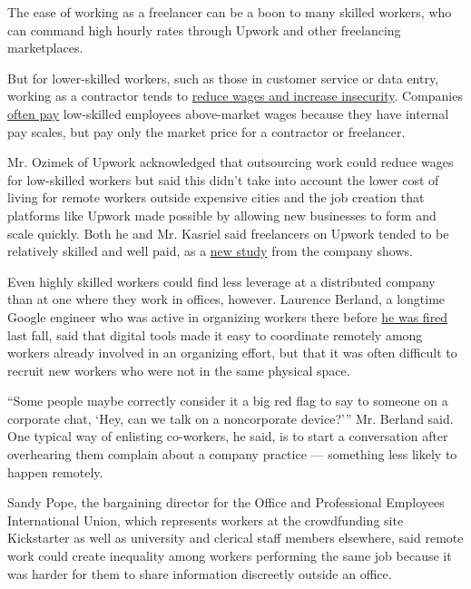 The ease of working as a freelancer can be a boon to many skilled
workers, who can command high hourly rates through Upwork and other
freelancing marketplaces.

But for lower-skilled workers, such as those in customer service or data
entry, working as a contractor tends to
\href{https://www.nytimes3xbfgragh.onion/2017/07/12/business/economy/flash-organizations-labor.html}{reduce
wages and increase insecurity}. Companies
\href{https://www.nytimes3xbfgragh.onion/interactive/2018/02/01/business/economy/wages-salaries-job-market.html}{often
pay} low-skilled employees above-market wages because they have internal
pay scales, but pay only the market price for a contractor or
freelancer.

Mr. Ozimek of Upwork acknowledged that outsourcing work could reduce
wages for low-skilled workers but said this didn't take into account the
lower cost of living for remote workers outside expensive cities and the
job creation that platforms like Upwork made possible by allowing new
businesses to form and scale quickly. Both he and Mr. Kasriel said
freelancers on Upwork tended to be relatively skilled and well paid, as
a
\href{https://www.upwork.com/press/economics/when-work-goes-remote/}{new
study} from the company shows.

Even highly skilled workers could find less leverage at a distributed
company than at one where they work in offices, however. Laurence
Berland, a longtime Google engineer who was active in organizing workers
there before
\href{https://www.nytimes3xbfgragh.onion/interactive/2020/02/18/magazine/google-revolt.html}{he
was fired} last fall, said that digital tools made it easy to coordinate
remotely among workers already involved in an organizing effort, but
that it was often difficult to recruit new workers who were not in the
same physical space.

``Some people maybe correctly consider it a big red flag to say to
someone on a corporate chat, `Hey, can we talk on a noncorporate
device?''' Mr. Berland said. One typical way of enlisting co-workers, he
said, is to start a conversation after overhearing them complain about a
company practice --- something less likely to happen remotely.

Sandy Pope, the bargaining director for the Office and Professional
Employees International Union, which represents workers at the
crowdfunding site Kickstarter as well as university and clerical staff
members elsewhere, said remote work could create inequality among
workers performing the same job because it was harder for them to share
information discreetly outside an office.

